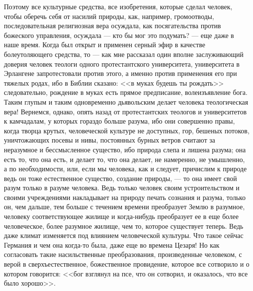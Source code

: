 \documentclass[12pt]{article}
\begin{document}
Поэтому все культурные средства, все изобретения, которые сделал человек, чтобы оберечь себя от насилий природы, как, например, громоотводы, последовательная религиозная вера осуждала, как посягательства против божеского управления, осуждала --- кто бы мог это подумать? --- еще даже в наше время. Когда был открыт и применен серный эфир в качестве болеутоляющего средства, то --- как мне рассказал один вполне заслуживающий доверия человек теологи одного протестантского университета, университета в Эрлангене запротестовали против этого, а именно против применения его при тяжелых родах, ибо в Библии сказано: <<в муках будешь ты рождать>>  следовательно, рождение в муках есть прямое предписание, волеизъявление бога. Таким глупым и таким одновременно дьявольским делает человека теологическая вера! Вернемся, однако, опять назад от протестантских теологов и университетов к камчадалам, у которых гораздо больше разума, ибо они совершенно правы, когда творца крутых, человеческой культуре не доступных, гор, бешеных потоков, уничтожающих посевы и нивы, постоянных бурных ветров считают за неразумное и бессмысленное существо, ибо природа слепа и лишена разума; она есть то, что она есть, и делает то, что она делает, не намеренно, не умышленно, а по необходимости, или, если мы человека, как и следует, причислим к природе ведь он тоже естественное существо, создание природы, --- то она имеет свой разум только в разуме человека. Ведь только человек своим устроительством и своими учреждениями накладывает на природу печать сознания и разума, только он, чем дальше, тем больше с течением времени преобразует Землю в разумное, человеку соответствующее жилище и когда-нибудь преобразует ее в еще более человеческое, более разумное жилище, чем то, которое существует теперь. Ведь даже климат изменяется под влиянием человеческой культуры. Что такое сейчас Германия и чем она когда-то была, даже еще во времена Цезаря! Но как согласовать такие насильственные преобразования, произведенные человеком, с верой в сверхъестественное, божественное провидение, которое все сотворило и о котором говорится: <<бог взглянул на псе, что он сотворил, и оказалось, что все было хорошо>>. 
\end{document}
